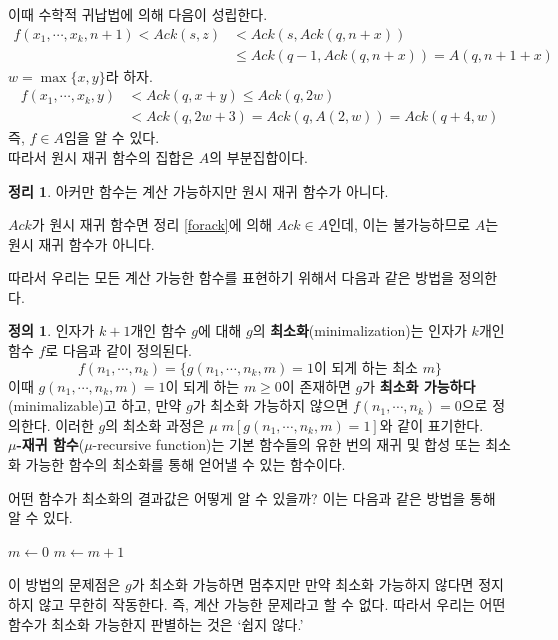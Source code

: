 \documentclass[b5paper]{book}
\theoremstyle{definition}
\newtheorem{defn}{정의}[chapter]
\newtheorem{thm}{정리}[chapter]
\newenvironment{pf*}{\pushQED{\qed}\pf}{\popQED\endpf}
\begin{document}
\begin{pf*}
    이때 수학적 귀납법에 의해 다음이 성립한다.
    \begin{align*}
        f(x_1, \cdots, x_k, n+1) < Ack(s, z) &< Ack(s, Ack(q, n+x)) \\ 
       &\le Ack(q-1, Ack(q, n+x)) = A(q, n+1+x)
    \end{align*}
    $w = \max\{x,y\}$라 하자. 
    \begin{align*}
        f(x_1, \cdots, x_k, y) &< Ack(q, x+y) \le Ack(q, 2w) \\ 
        &< Ack(q, 2w+3) = Ack(q, A(2,w)) = Ack(q+4, w) 
    \end{align*}
    즉, $f \in A$임을 알 수 있다. \\ 
    따라서 원시 재귀 함수의 집합은 $A$의 부분집합이다. 
\end{pf*}
\begin{thm}
    아커만 함수는 계산 가능하지만 원시 재귀 함수가 아니다. 
\end{thm}
\begin{pf*}
    $Ack$가 원시 재귀 함수면 정리 \ref{forack}에 의해 $Ack \in A$인데, 
    이는 불가능하므로 $A$는 원시 재귀 함수가 아니다. 
\end{pf*}
따라서 우리는 모든 계산 가능한 함수를 표현하기 위해서 다음과 같은 방법을 정의한다.
\begin{defn} \label{minimalization}
    인자가 $k+1$개인 함수 $g$에 대해 $g$의 \textbf{최소화}(minimalization)는
    인자가 $k$개인 함수 $f$로 다음과 같이 정의된다.
    $$f(n_1, \cdots, n_k) = \{g(n_1, \cdots, n_k, m) = 1\text{이 되게 하는 최소 } m\}$$
    이때 $g(n_1, \cdots, n_k, m) = 1$이 되게 하는 $m \ge 0$이 존재하면
    $g$가 \textbf{최소화 가능하다}(minimalizable)고 하고, 만약 
    $g$가 최소화 가능하지 않으면 $f(n_1, \cdots, n_k)=0$으로 정의한다. 
    이러한 $g$의 최소화 과정은 $\mu \; m[g(n_1, \cdots, n_k, m) = 1]$와 같이 표기한다. \\
    \textbf{$\mu$-재귀 함수}($\mu$-recursive function)는 기본 함수들의 유한 번의 재귀 및 합성 또는 최소화 가능한
    함수의 최소화를 통해 얻어낼 수 있는 함수이다. 
\end{defn}
어떤 함수가 최소화의 결과값은 어떻게 알 수 있을까? 이는 다음과 같은 방법을 통해 알 수 있다.
\begin{algorithmic}
        \State $m \gets 0$
            \State $m \gets m+1$
        \EndWhile
\end{algorithmic}
이 방법의 문제점은 $g$가 최소화 가능하면 멈추지만 만약 최소화 가능하지 않다면 정지하지 않고 무한히 작동한다.
즉, 계산 가능한 문제라고 할 수 없다. 따라서 우리는 어떤 함수가 최소화 가능한지 판별하는 것은 `쉽지 않다.'\\
\end{document}
